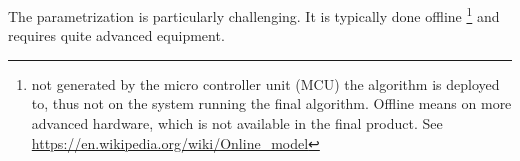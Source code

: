 The parametrization is particularly challenging. It is typically done offline \footnote{not generated by the micro controller unit (MCU) the algorithm is deployed to, thus not on the system running the final algorithm. Offline means on more advanced hardware, which is not available in the final product. See \url{https://en.wikipedia.org/wiki/Online_model} } and requires quite advanced equipment.

%
% 
%
%
%
%
%
%
